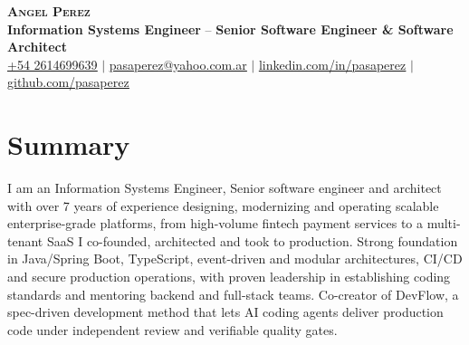\documentclass[letterpaper,11pt]{article}
\begin{document}


\begin{center}
    \textbf{\Huge \scshape Angel Perez} \\ \vspace{2pt}
    \small \textbf{Information Systems Engineer}
    --
    \small \textbf{Senior Software Engineer \& Software Architect} \\ \vspace{2pt}
    \small \href{tel:+542614699639}{\underline{+54 2614699639}} $|$ \href{mailto:pasaperez@yahoo.com.ar}{\underline{pasaperez@yahoo.com.ar}} $|$
    \href{https://www.linkedin.com/in/pasaperez}{\underline{linkedin.com/in/pasaperez}} $|$
    \href{https://github.com/pasaperez}{\underline{github.com/pasaperez}}
\end{center}


\section{Summary}
I am an Information Systems Engineer, Senior software engineer and architect with over 7 years of experience designing, modernizing and operating scalable enterprise-grade platforms, from high-volume fintech payment services to a multi-tenant SaaS I co-founded, architected and took to production. Strong foundation in Java/Spring Boot, TypeScript, event-driven and modular architectures, CI/CD and secure production operations, with proven leadership in establishing coding standards and mentoring backend and full-stack teams. Co-creator of DevFlow, a spec-driven development method that lets AI coding agents deliver production code under independent review and verifiable quality gates.

\end{document}
